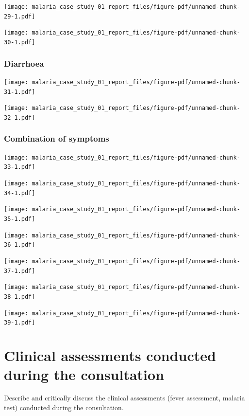 \documentclass[
  letterpaper,
  DIV=11,
  numbers=noendperiod,
  oneside]{scrreprt}
\begin{document}
\texttt{[image: malaria\_case\_study\_01\_report\_files/figure-pdf/unnamed-chunk-29-1.pdf]}

\texttt{[image: malaria\_case\_study\_01\_report\_files/figure-pdf/unnamed-chunk-30-1.pdf]}

\hypertarget{diarrhoea}{%
\subsubsection{Diarrhoea}\label{diarrhoea}}

\texttt{[image: malaria\_case\_study\_01\_report\_files/figure-pdf/unnamed-chunk-31-1.pdf]}

\texttt{[image: malaria\_case\_study\_01\_report\_files/figure-pdf/unnamed-chunk-32-1.pdf]}

\hypertarget{combination-of-symptoms}{%
\subsubsection{Combination of symptoms}\label{combination-of-symptoms}}

\texttt{[image: malaria\_case\_study\_01\_report\_files/figure-pdf/unnamed-chunk-33-1.pdf]}

\texttt{[image: malaria\_case\_study\_01\_report\_files/figure-pdf/unnamed-chunk-34-1.pdf]}

\texttt{[image: malaria\_case\_study\_01\_report\_files/figure-pdf/unnamed-chunk-35-1.pdf]}

\texttt{[image: malaria\_case\_study\_01\_report\_files/figure-pdf/unnamed-chunk-36-1.pdf]}

\texttt{[image: malaria\_case\_study\_01\_report\_files/figure-pdf/unnamed-chunk-37-1.pdf]}

\texttt{[image: malaria\_case\_study\_01\_report\_files/figure-pdf/unnamed-chunk-38-1.pdf]}

\texttt{[image: malaria\_case\_study\_01\_report\_files/figure-pdf/unnamed-chunk-39-1.pdf]}

\hypertarget{clinical-assessments-conducted-during-the-consultation}{%
\section{Clinical assessments conducted during the
consultation}\label{clinical-assessments-conducted-during-the-consultation}}

Describe and critically discuss the clinical assessments (fever
assessment, malaria test) conducted during the consultation.
\end{document}
